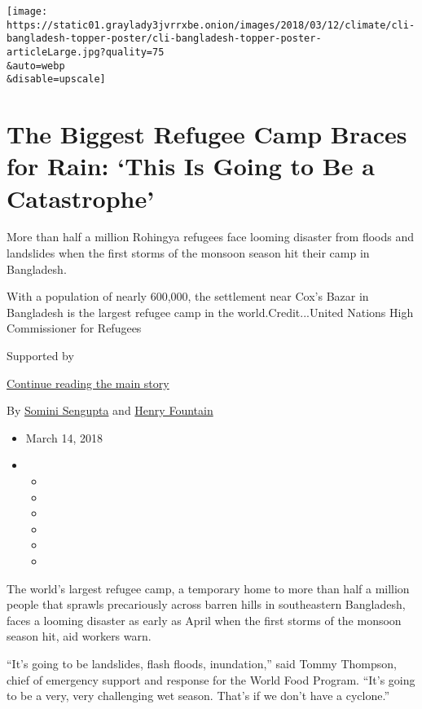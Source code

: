 \texttt{[image: https://static01.graylady3jvrrxbe.onion/images/2018/03/12/climate/cli-bangladesh-topper-poster/cli-bangladesh-topper-poster-articleLarge.jpg?quality=75\\\&auto=webp\\\&disable=upscale]}

\hypertarget{the-biggest-refugee-camp-braces-for-rain-this-is-going-to-be-a-catastrophe}{%
\section{The Biggest Refugee Camp Braces for Rain: `This Is Going to Be
a
Catastrophe'}\label{the-biggest-refugee-camp-braces-for-rain-this-is-going-to-be-a-catastrophe}}

More than half a million Rohingya refugees face looming disaster from
floods and landslides when the first storms of the monsoon season hit
their camp in Bangladesh.

With a population of nearly 600,000, the settlement near Cox's Bazar in
Bangladesh is the largest refugee camp in the world.Credit...United
Nations High Commissioner for Refugees

Supported by

\protect\hyperlink{after-sponsor}{Continue reading the main story}

By \href{http://www.nytimes3xbfgragh.onion/by/somini-sengupta}{Somini
Sengupta} and
\href{http://www.nytimes3xbfgragh.onion/by/henry-fountain}{Henry
Fountain}

\begin{itemize}
\item
  March 14, 2018
\item
  \begin{itemize}
  \item
  \item
  \item
  \item
  \item
  \item
  \end{itemize}
\end{itemize}

The world's largest refugee camp, a temporary home to more than half a
million people that sprawls precariously across barren hills in
southeastern Bangladesh, faces a looming disaster as early as April when
the first storms of the monsoon season hit, aid workers warn.

``It's going to be landslides, flash floods, inundation,'' said Tommy
Thompson, chief of emergency support and response for the World Food
Program. ``It's going to be a very, very challenging wet season. That's
if we don't have a cyclone.''

